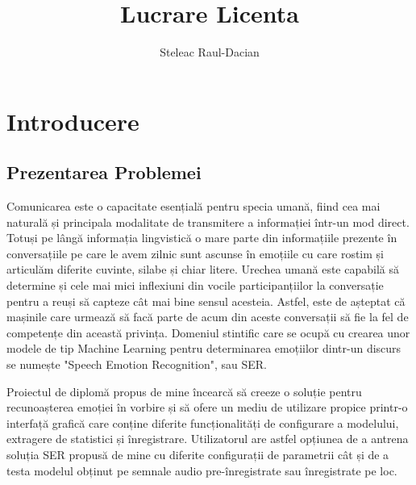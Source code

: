 \documentclass[a4paper,12pt]{book}
\title{Lucrare Licenta}
\author{Steleac Raul-Dacian}
\begin{document}
	
	\clearpage
	\thispagestyle{empty}
	\tableofcontents
	\thispagestyle{empty}
	\clearpage
	\newpage 
	\thispagestyle{empty}
	
	\chapter{Introducere}
	
		\section{Prezentarea Problemei}
						
			\setlength{\parindent}{0.8cm}
			
			Comunicarea este o capacitate esențială pentru specia umană, fiind cea mai naturală și principala modalitate de transmitere a informației într-un mod direct. Totuși pe lângă informația lingvistică o mare parte din informațiile prezente în conversațiile pe care le avem zilnic sunt ascunse în emoțiile cu care rostim și articulăm diferite cuvinte, silabe și chiar litere. Urechea umană este capabilă să determine și cele mai mici inflexiuni din vocile participanțiilor la conversație pentru a reuși să capteze cât mai bine sensul acesteia. Astfel, este de așteptat că mașinile care urmează să facă parte de acum din aceste conversații să fie la fel de competențe din această privința. Domeniul stintific care se ocupă cu crearea unor modele de tip Machine Learning pentru determinarea emoțiilor dintr-un discurs se numește "Speech Emotion Recognition", sau SER. \par
			
			Proiectul de diplomă propus de mine încearcă să creeze o soluție pentru recunoașterea emoției în vorbire și să ofere un mediu de utilizare propice printr-o interfață grafică care conține diferite funcționalități de configurare a modelului, extragere de statistici și înregistrare. Utilizatorul are astfel opțiunea de a antrena soluția SER propusă de mine cu diferite configurații de parametrii cât și de a testa modelul obținut pe semnale audio pre-înregistrate sau înregistrate pe loc.\par
			
\end{document}
